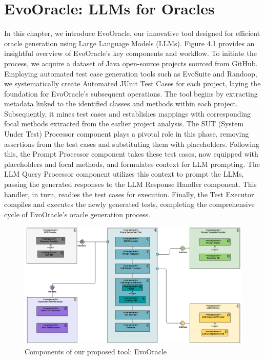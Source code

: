 \chapter{EvoOracle: LLMs for Oracles}
\label{cha:evoOracles}
\vspace{0.4 cm}

In this chapter, we introduce EvoOracle, our innovative tool designed for efficient oracle generation using Large Language Models (LLMs). Figure 4.1 provides an insightful overview of EvoOracle's key components and workflow. To initiate the process, we acquire a dataset of Java open-source projects sourced from GitHub. Employing automated test case generation tools such as EvoSuite and Randoop, we systematically create Automated JUnit Test Cases for each project, laying the foundation for EvoOracle's subsequent operations. The tool begins by extracting metadata linked to the identified classes and methods within each project. Subsequently, it mines test cases and establishes mappings with corresponding focal methods extracted from the earlier project analysis. The SUT (System Under Test) Processor component plays a pivotal role in this phase, removing assertions from the test cases and substituting them with placeholders. Following this, the Prompt Processor component takes these test cases, now equipped with placeholders and focal methods, and formulates context for LLM prompting. The LLM Query Processor component utilizes this context to prompt the LLMs, passing the generated responses to the LLM Response Handler component. This handler, in turn, readies the test cases for execution. Finally, the Test Executor compiles and executes the newly generated tests, completing the comprehensive cycle of EvoOracle's oracle generation process.

\begin{figure}[H]
\centering
\includegraphics[width=1\textwidth]{images/UML_Component_Diagram_EvoOracle_v2.png}
\caption{Components of our proposed tool: EvoOracle}
\label{fig:component_diagram}
\end{figure}

